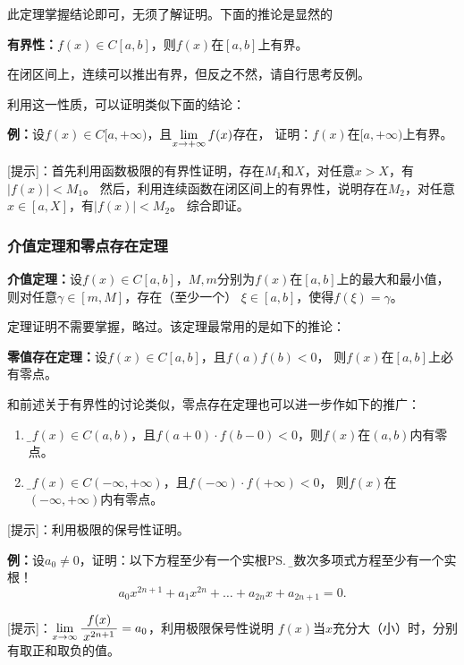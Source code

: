此定理掌握结论即可，无须了解证明。下面的推论是显然的

\begin{thx}
	{\bf 有界性：}$f(x)\in C[a,b]$，则$f(x)$在$[a,b]$上有界。
\end{thx}
在闭区间上，连续可以推出有界，但反之不然，请自行思考反例。

利用这一性质，可以证明类似下面的结论：

{\bf 例：}设$f(x)\in C[a,+\infty)$，且$\lim\limits_{x\to{+\infty}}f(x)$存在，
证明：$f(x)$在$[a,+\infty)$上有界。

[提示]：首先利用函数极限的有界性证明，存在$M_1$和$X$，对任意$x>X$，有$|f(x)|<M_1$。
然后，利用连续函数在闭区间上的有界性，说明存在$M_2$，对任意$x\in[a,X]$，有$|f(x)|<M_2$。
综合即证。

\subsubsection{介值定理和零点存在定理}

\begin{thx}
	{\bf 介值定理：}设$f(x)\in C[a,b]$，$M,m$分别为$f(x)$在$[a,b]$上的最大和最小值，
	则对任意$\gamma\in[m,M]$，存在（至少一个）
	$\xi\in[a,b]$，使得$f(\xi)=\gamma$。
\end{thx}

定理证明不需要掌握，略过。该定理最常用的是如下的推论：

\begin{thx}
	{\bf 零值存在定理：}设$f(x)\in C[a,b]$，且$f(a)f(b)<0$，
	则$f(x)$在$[a,b]$上必有零点。
\end{thx}

和前述关于有界性的讨论类似，零点存在定理也可以进一步作如下的推广：
\begin{enumerate}[(1)]
  \setlength{\itemindent}{1cm}
  \item {\b 设$f(x)\in C(a,b)$，且$f(a+0)\cdot f(b-0)<0$，则$f(x)$在$(a,b)$内有零点。} 
  \item {\b 设$f(x)\in C(-\infty,+\infty)$，且$f(-\infty)\cdot f(+\infty)<0$，
  则$f(x)$在$(-\infty,+\infty)$内有零点。}
\end{enumerate}

[提示]：利用极限的保号性证明。

{\bf 例：}设$a_0\ne 0$，证明：以下方程至少有一个实根\ps{\b 奇数次多项式方程至少有一个实根！}
$$a_0x^{2n+1}+a_1x^{2n}+\ldots+a_{2n}x+a_{2n+1}=0.$$

[提示]：$\lim\limits_{x\to{\infty}}\displaystyle\frac{\,{f(x)}\,}{\,{x^{2n+1}}\,}=a_0$，利用极限保号性说明
$f(x)$当$x$充分大（小）时，分别有取正和取负的值。

